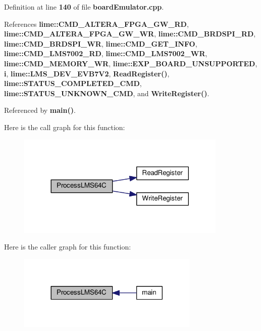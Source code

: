 Definition at line {\bf 140} of file {\bf board\+Emulator.\+cpp}.



References {\bf lime\+::\+C\+M\+D\+\_\+\+A\+L\+T\+E\+R\+A\+\_\+\+F\+P\+G\+A\+\_\+\+G\+W\+\_\+\+RD}, {\bf lime\+::\+C\+M\+D\+\_\+\+A\+L\+T\+E\+R\+A\+\_\+\+F\+P\+G\+A\+\_\+\+G\+W\+\_\+\+WR}, {\bf lime\+::\+C\+M\+D\+\_\+\+B\+R\+D\+S\+P\+I\+\_\+\+RD}, {\bf lime\+::\+C\+M\+D\+\_\+\+B\+R\+D\+S\+P\+I\+\_\+\+WR}, {\bf lime\+::\+C\+M\+D\+\_\+\+G\+E\+T\+\_\+\+I\+N\+FO}, {\bf lime\+::\+C\+M\+D\+\_\+\+L\+M\+S7002\+\_\+\+RD}, {\bf lime\+::\+C\+M\+D\+\_\+\+L\+M\+S7002\+\_\+\+WR}, {\bf lime\+::\+C\+M\+D\+\_\+\+M\+E\+M\+O\+R\+Y\+\_\+\+WR}, {\bf lime\+::\+E\+X\+P\+\_\+\+B\+O\+A\+R\+D\+\_\+\+U\+N\+S\+U\+P\+P\+O\+R\+T\+ED}, {\bf i}, {\bf lime\+::\+L\+M\+S\+\_\+\+D\+E\+V\+\_\+\+E\+V\+B7\+V2}, {\bf Read\+Register()}, {\bf lime\+::\+S\+T\+A\+T\+U\+S\+\_\+\+C\+O\+M\+P\+L\+E\+T\+E\+D\+\_\+\+C\+MD}, {\bf lime\+::\+S\+T\+A\+T\+U\+S\+\_\+\+U\+N\+K\+N\+O\+W\+N\+\_\+\+C\+MD}, and {\bf Write\+Register()}.



Referenced by {\bf main()}.



Here is the call graph for this function\+:
\nopagebreak
\begin{figure}[H]
\begin{center}
\leavevmode
\includegraphics[width=284pt]{df/df6/boardEmulator_8cpp_a83e9fda9cb90993c61661958dd030d40_cgraph}
\end{center}
\end{figure}




Here is the caller graph for this function\+:
\nopagebreak
\begin{figure}[H]
\begin{center}
\leavevmode
\includegraphics[width=245pt]{df/df6/boardEmulator_8cpp_a83e9fda9cb90993c61661958dd030d40_icgraph}
\end{center}
\end{figure}


